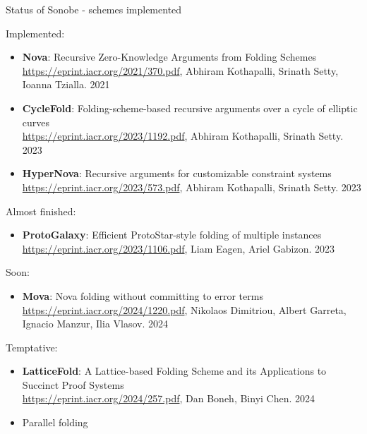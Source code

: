 \documentclass[t]{beamer}
\begin{document}
\begin{frame}{Status of Sonobe - schemes implemented}
  \scriptsize{

  Implemented:
  \begin{itemize}
    \item \textbf{Nova}: Recursive Zero-Knowledge Arguments from Folding Schemes\\ \href{https://eprint.iacr.org/2021/370.pdf}{https://eprint.iacr.org/2021/370.pdf}, Abhiram Kothapalli, Srinath Setty, Ioanna Tzialla. 2021
    \item \textbf{CycleFold}: Folding-scheme-based recursive arguments over a cycle of elliptic curves\\ \href{https://eprint.iacr.org/2023/1192.pdf}{https://eprint.iacr.org/2023/1192.pdf}, Abhiram Kothapalli, Srinath Setty. 2023
    \item \textbf{HyperNova}: Recursive arguments for customizable constraint systems\\ \href{https://eprint.iacr.org/2023/573.pdf}{https://eprint.iacr.org/2023/573.pdf}, Abhiram Kothapalli, Srinath Setty. 2023
  \end{itemize}
  Almost finished:
  \begin{itemize}
    \item \textbf{ProtoGalaxy}: Efficient ProtoStar-style folding of multiple instances\\ \href{https://eprint.iacr.org/2023/1106.pdf}{https://eprint.iacr.org/2023/1106.pdf}, Liam Eagen, Ariel Gabizon. 2023
  \end{itemize}
  Soon:
  \begin{itemize}
    \item \textbf{Mova}: Nova folding without committing to error terms\\ \href{https://eprint.iacr.org/2024/1220.pdf}{https://eprint.iacr.org/2024/1220.pdf}, Nikolaos Dimitriou, Albert Garreta, Ignacio Manzur, Ilia Vlasov. 2024
  \end{itemize}
  Temptative:
  \begin{itemize}
    \item \textbf{LatticeFold}: A Lattice-based Folding Scheme and its Applications to Succinct Proof Systems\\ \href{https://eprint.iacr.org/2024/257.pdf}{https://eprint.iacr.org/2024/257.pdf}, Dan Boneh, Binyi Chen. 2024
    \item Parallel folding
  \end{itemize}

  }
\end{frame}
\end{document}
